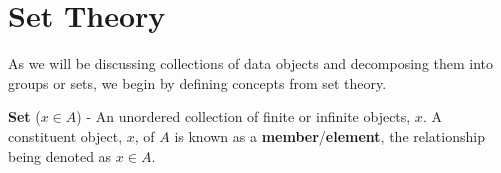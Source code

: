 
\section{Set Theory}

As we will be discussing collections of data objects and decomposing them into groups or sets, we begin by defining concepts from set theory.
%
\begin{defn}
  \textbf{Set} ($x \in A$) - An unordered collection of finite or infinite objects, $x$.
  A constituent object, $x$, of $A$ is known as a \textbf{member}/\textbf{element}, the relationship being denoted as $x \in A$.
\end{defn}

